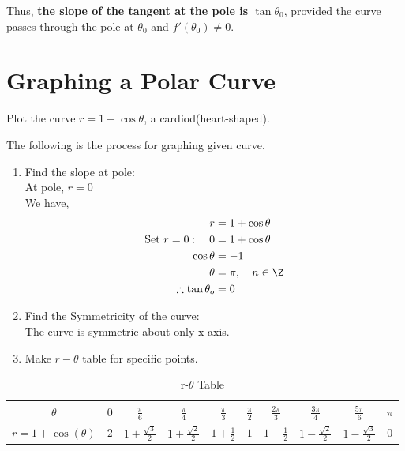    Thus, \textbf{the slope of the tangent at the pole is \(
    \tan\theta_0 \)}, provided the curve passes through the
    pole at \( \theta_0 \) and \( f'(\theta_0) \neq 0 \).

    \section{Graphing a Polar Curve}
    \label{sec:graphing-a-polar-curve}
    \begin{exercise}
      Plot the curve \(r=1+\cos\theta\), a cardiod(heart-shaped).
    \end{exercise}
    \begin{answer}
      The following is the process for graphing given curve.
      \begin{enumerate}
        \item Find the slope at pole:\\
          At pole, \(r=0\)\\
          We have,
          \begin{align*}
            r &= 1 + \cos\theta \\
            \text{Set } r = 0: \quad 0 &= 1 + \cos\theta \\
            \cos\theta &= -1 \\
            \theta &= \pi, \quad n \in \Z\\
            \therefore \tan\theta_o &= 0
          \end{align*}

        \item Find the Symmetricity of the curve:\\
          The curve is symmetric about only x-axis.

        \item Make \(r-\theta\) table for specific points.

      \end{enumerate}
    \end{answer}

    \begin{table}[htpb]
      \centering
      \begin{tabular}{|c|c|c|c|c|c|c|c|c|c|}
        \hline
        \(\theta\) & \(0\) & \(\frac{\pi}{6}\) &
        \(\frac{\pi}{4}\) & \(\frac{\pi}{3}\) &
        \(\frac{\pi}{2}\) & \(\frac{2\pi}{3}\) &
        \(\frac{3\pi}{4}\) & \(\frac{5\pi}{6}\) &
        \(\pi\)\\

        \hline

        \(r = 1+\cos(\theta)\) & \(2\) & \(1 +
        \frac{\sqrt{3}}{2}\) & \(1 +
        \frac{\sqrt{2}}{2}\) & \(1 + \frac{1}{2}\) &
        \(1\) & \(1 - \frac{1}{2}\) & \(1 -
        \frac{\sqrt{2}}{2}\) & \(1 -
        \frac{\sqrt{3}}{2}\) & \(0\)\\

        \hline
      \end{tabular}
      \caption{r-\(\theta\) Table}
      \label{tab:r-theta-table}
    \end{table}

